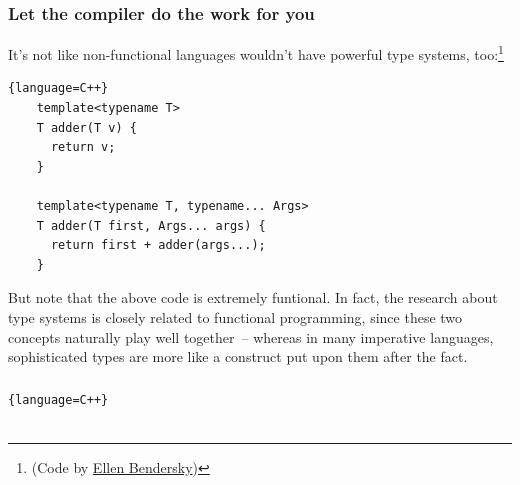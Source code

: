\documentclass{beamer}
\begin{document}
\begin{frame}[containsverbatim]
  \frametitle{Let the compiler do the work for you} 

  It's not like non-functional languages wouldn't have powerful type systems, too:\footnote{%
    (Code by \href{http://eli.thegreenplace.net/2014/variadic-templates-in-c/}{Ellen Bendersky})}

  \begin{lstlisting}{language=C++}
    template<typename T>
    T adder(T v) {
      return v;
    }

    template<typename T, typename... Args>
    T adder(T first, Args... args) {
      return first + adder(args...);
    }
  \end{lstlisting}

  But note that the above code is extremely funtional. In fact, the research about type systems is
  closely related to functional programming, since these two concepts naturally play well
  together~-- whereas in many imperative languages, sophisticated types are more like a construct
  put upon them after the fact.
\end{frame}
















\begin{frame}[containsverbatim]
  \frametitle{} 

  \begin{lstlisting}{language=C++}
    
  \end{lstlisting}

\end{frame}
\end{document}
